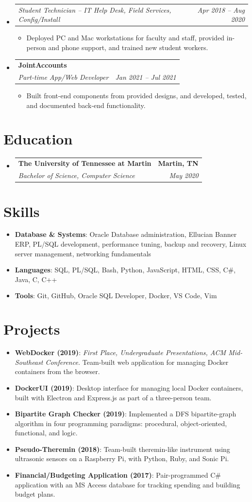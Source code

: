 \documentclass[letterpaper,11pt]{article}
\makeatletter
\newcommand{\resumeSubheading}[4]{
  \item
  \begin{tabular*}{\textwidth}[t]{l@{\extracolsep{\fill}}r}
    \textbf{#1} & \textbf{#2} \\
    \textit{\small #3} & \textit{\small #4} \\
  \end{tabular*}\vspace{-2pt}
}
\newcommand{\resumeSubRole}[2]{
  \item
  \begin{tabular*}{\textwidth}[t]{l@{\extracolsep{\fill}}r}
    \textit{\small #1} & \textit{\small #2} \\
  \end{tabular*}\vspace{-2pt}
}
\newcommand{\resumeItem}[2]{\item \small{\textbf{#1}: #2}}
\newenvironment{entries}{\begin{itemize}[leftmargin=0in, label={}, itemsep=1pt, topsep=0pt]}{\end{itemize}}
\newenvironment{bullets}{\begin{itemize}[leftmargin=0.2in, itemsep=0pt, topsep=1pt, parsep=0pt, label=\textbullet]\small}{\end{itemize}}
\makeatother
\begin{document}
\begin{entries}
  \resumeSubRole{Student Technician -- IT Help Desk, Field Services, Config/Install}{Apr 2018 -- Aug 2020}
  \begin{bullets}
    \item Deployed PC and Mac workstations for faculty and staff, provided in-person and phone support,
      and trained new student workers.
  \end{bullets}

  \resumeSubheading{JointAccounts}{}
    {Part-time App/Web Developer}{Jan 2021 -- Jul 2021}
  \begin{bullets}
    \item Built front-end components from provided designs, and developed, tested, and documented
      back-end functionality.
  \end{bullets}

\end{entries}

\section{Education}
\begin{entries}
  \resumeSubheading{The University of Tennessee at Martin}{Martin, TN}
    {Bachelor of Science, Computer Science}{May 2020}
\end{entries}

\section{Skills}
\begin{entries}
  \resumeItem{Database \& Systems}{Oracle Database administration, Ellucian Banner ERP, PL/SQL development,
    performance tuning, backup and recovery, Linux server management, networking fundamentals}
  \resumeItem{Languages}{SQL, PL/SQL, Bash, Python, JavaScript, HTML, CSS, C\#, Java, C, C++}
  \resumeItem{Tools}{Git, GitHub, Oracle SQL Developer, Docker, VS Code, Vim}
\end{entries}

\section{Projects}
\begin{entries}
  \resumeItem{WebDocker (2019)}{\textit{First Place, Undergraduate Presentations, ACM Mid-Southeast Conference.}
    Team-built web application for managing Docker containers from the browser.}
  \resumeItem{DockerUI (2019)}{Desktop interface for managing local Docker containers, built with Electron and
    Express.js as part of a three-person team.}
  \resumeItem{Bipartite Graph Checker (2019)}{Implemented a DFS bipartite-graph algorithm in four programming
    paradigms: procedural, object-oriented, functional, and logic.}
  \resumeItem{Pseudo-Theremin (2018)}{Team-built theremin-like instrument using ultrasonic sensors on a Raspberry Pi,
    with Python, Ruby, and Sonic Pi.}
  \resumeItem{Financial/Budgeting Application (2017)}{Pair-programmed C\# application with an MS Access database
    for tracking spending and building budget plans.}
\end{entries}
\end{document}
